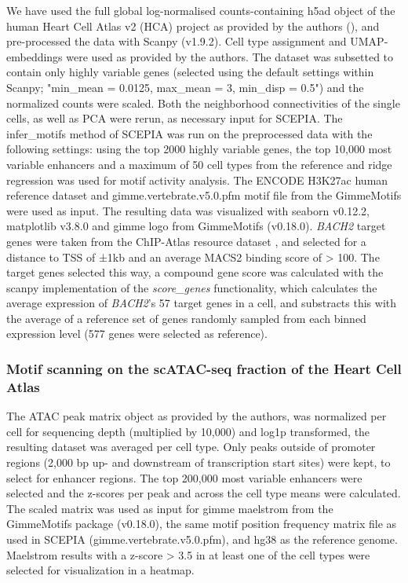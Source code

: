 We have used the full global log-normalised counts-containing h5ad object of the human Heart Cell Atlas v2 (HCA) project as provided by the authors (\cite{Kanemaru2023}), and pre-processed the data with Scanpy (v1.9.2). Cell type assignment and UMAP-embeddings were used as provided by the authors. The dataset was subsetted to contain only highly variable genes (selected using the default settings within Scanpy; "min\_mean = 0.0125, max\_mean = 3, min\_disp = 0.5") and the normalized counts were scaled. Both the neighborhood connectivities of the single cells, as well as PCA were rerun, as necessary input for SCEPIA. The infer\_motifs method of SCEPIA was run on the preprocessed data with the following settings: using the top 2000 highly variable genes, the top 10,000 most variable enhancers and a maximum of 50 cell types from the reference and ridge regression was used for motif activity analysis. The ENCODE H3K27ac human reference dataset and gimme.vertebrate.v5.0.pfm motif file from the GimmeMotifs were used as input. The resulting data was visualized with seaborn v0.12.2, matplotlib v3.8.0 and gimme logo from GimmeMotifs (v0.18.0). \textit{BACH2} target genes were taken from the ChIP-Atlas resource dataset \cite{Oki2018,Zou2022,BACH2_target_genes}, and selected for a distance to TSS of ±1kb and an average MACS2 binding score of > 100. The target genes selected this way, a compound gene score was calculated with the scanpy implementation of the \textit{score\_genes} functionality, which calculates the average expression of \textit{BACH2}'s 57 target genes in a cell, and substracts this with the average of a reference set of genes randomly sampled from each binned expression level (577 genes were selected as reference).

\subsubsection{Motif scanning on the scATAC-seq fraction of the Heart Cell Atlas}

The ATAC peak matrix object as provided by the authors, was normalized per cell for sequencing depth (multiplied by 10,000) and log1p transformed, the resulting dataset was averaged per cell type. Only peaks outside of promoter regions (2,000 bp up- and downstream of transcription start sites) were kept, to select for enhancer regions. The top 200,000 most variable enhancers were selected and the z-scores per peak and across the cell type means were calculated. The scaled matrix was used as input for gimme maelstrom from the GimmeMotifs package (v0.18.0), the same motif position frequency matrix file as used in SCEPIA (gimme.vertebrate.v5.0.pfm), and hg38 as the reference genome. Maelstrom results with a z-score > 3.5 in at least one of the cell types were selected for visualization in a heatmap.

